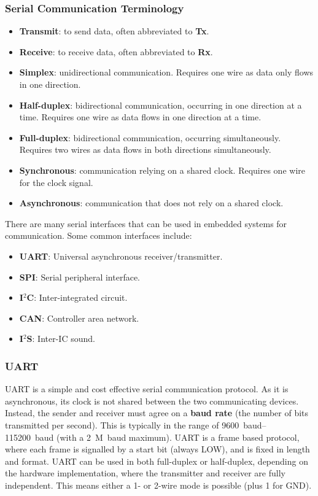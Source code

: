 \documentclass{article}
\begin{document}
\subsubsection{Serial Communication Terminology}
\begin{itemize}
    \item \textbf{Transmit}: to send data, often abbreviated to \textbf{Tx}.
    \item \textbf{Receive}: to receive data, often abbreviated to \textbf{Rx}.
    \item \textbf{Simplex}: unidirectional communication. Requires one wire as data only flows in one direction.
    \item \textbf{Half-duplex}: bidirectional communication, occurring in one direction at a time. Requires one wire as data flows in one direction at a time.
    \item \textbf{Full-duplex}: bidirectional communication, occurring simultaneously. Requires two wires as data flows in both directions simultaneously.
    \item \textbf{Synchronous}: communication relying on a shared clock. Requires one wire for the clock signal.
    \item \textbf{Asynchronous}: communication that does not rely on a shared clock.
\end{itemize}
There are many serial interfaces that can be used in embedded systems
for communication. Some common interfaces include:
\begin{itemize}
    \item \textbf{UART}: Universal asynchronous receiver/transmitter.
    \item \textbf{SPI}: Serial peripheral interface.
    \item \textbf{I\({}^2\)C}: Inter-integrated circuit.
    \item \textbf{CAN}: Controller area network.
    \item \textbf{I\({}^2\)S}: Inter-IC sound.
\end{itemize}
\subsubsection{UART}
UART is a simple and cost effective serial communication protocol. As
it is asynchronous, its clock is not shared between the two
communicating devices. Instead, the sender and receiver must agree on a
\textbf{baud rate} (the number of bits transmitted per second). This is
typically in the range of
\qtyrange[range-phrase=~to~]{9600}{115200}{baud} (with a \qty{2}{M.baud}
maximum).
UART is a frame based protocol, where each frame is signalled by a
start bit (always LOW), and is fixed in length and format. UART can be
used in both full-duplex or half-duplex, depending on the hardware
implementation, where the transmitter and receiver are fully
independent. This means either a 1- or 2-wire mode is possible (plus 1
for GND).
\end{document}
